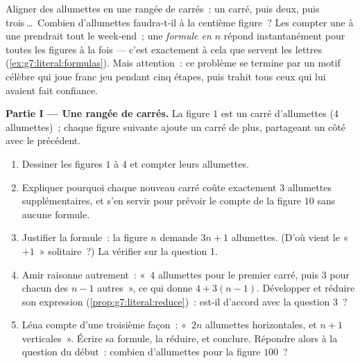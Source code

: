 \begin{problem}
\label{pb:g7:literal:1}
Aligner des allumettes en une rangée de carrés~: un carré, puis
deux, puis trois\,\dots\ Combien d'allumettes faudra-t-il à la
centième figure~? Les compter une à une prendrait tout le week-end~;
une \emph{formule en $n$} répond instantanément pour toutes les
figures à la fois --- c'est exactement à cela que servent les lettres
(\cref{ex:g7:literal:formulas}). Mais attention~: ce problème se
termine par un motif célèbre qui joue franc jeu pendant cinq étapes,
puis trahit tous ceux qui lui avaient fait confiance.

\medskip
\noindent\textbf{Partie I --- Une rangée de carrés.}
La figure $1$ est un carré d'allumettes ($4$ allumettes)~; chaque
figure suivante ajoute un carré de plus, partageant un côté avec le
précédent.
\begin{enumerate}
  \item Dessiner les figures $1$ à $4$ et compter leurs allumettes.
  \item Expliquer pourquoi chaque nouveau carré coûte exactement $3$
        allumettes supplémentaires, et s'en servir pour prévoir le
        compte de la figure $10$ sans aucune formule.
  \item Justifier la formule~: la figure $n$ demande $3n + 1$
        allumettes. (D'où vient le «~$+1$~» solitaire~?) La
        vérifier sur la question 1.
  \item Amir raisonne autrement~: «~$4$ allumettes pour le premier
        carré, puis $3$ pour chacun des $n - 1$ autres~», ce qui
        donne $4 + 3(n - 1)$. Développer et réduire son expression
        (\cref{prop:g7:literal:reduce})~: est-il d'accord avec la
        question 3~?
  \item Léna compte d'une troisième façon~: «~$2n$ allumettes
        horizontales, et $n + 1$ verticales~». Écrire sa formule, la
        réduire, et conclure. Répondre alors à la question du
        début~: combien d'allumettes pour la figure $100$~?
\end{enumerate}


\end{problem}
